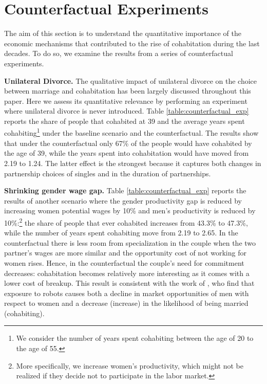 \documentclass[12pt]{article}
\numberwithin{table}{section}
\begin{document}
\section{Counterfactual Experiments}
The aim of this section is to understand the quantitative importance of the economic mechanisms that contributed to the rise of cohabitation during the last decades. To do so, we examine the results from a series of counterfactual experiments.

\textbf{Unilateral Divorce.} The qualitative impact of unilateral divorce on the choice between marriage and cohabitation has been largely discussed throughout this paper. Here we assess its quantitative relevance by performing an experiment where unilateral divorce is never introduced. Table \ref{table:counterfactual_exp} reports the share of people that cohabited at 39 and the average years spent cohabiting\footnote{We consider the number of years spent cohabiting between the age of 20 to the age of 55.} under the baseline scenario and the counterfactual. The results show that under the counterfactual only 67\% of the people would have cohabited by the age of 39, while the years spent into cohabitation would have moved from 2.19 to 1.24. The latter effect is the strongest because it captures both changes in partnership choices of singles and in the duration of partnerships.

\textbf{Shrinking gender wage gap.} Table \ref{table:counterfactual_exp} reports the results of another scenario where the gender productivity gap is reduced by increasing women potential wages by 10\% and men's productivity is reduced by 10\%:\footnote{More specifically, we increase women's productivity, which might not be realized if they decide not to participate in the labor market.} the share of people that ever cohabited increases from 43.3\% to 47.3\%, while the number of years spent cohabiting move from 2.19 to 2.65. In the counterfactual there is less room from specialization in the couple when the two partner's wages are more similar and the opportunity cost of not working for women rises. Hence, in the counterfactual the couple's need for commitment decreases: cohabitation becomes relatively more interesting as it comes with a lower cost of breakup. This result is consistent with the work of \cite{anelli2019}, who find that exposure to robots causes both a decline in market opportunities of men with respect to women and a decrease (increase) in the likelihood of being married (cohabiting).
\end{document}
